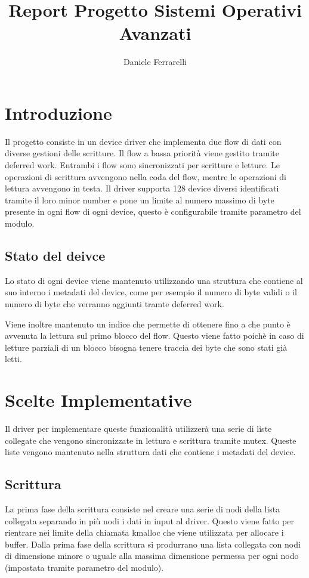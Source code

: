 \documentclass[a4paper,10pt]{article}
\title{Report Progetto Sistemi Operativi Avanzati}
\author{Daniele Ferrarelli}
\date{}
\begin{document}
\maketitle

\section{Introduzione}
Il progetto consiste in un device driver che implementa due flow di dati con diverse gestioni delle scritture. Il flow a bassa priorità viene gestito tramite deferred work. Entrambi i flow sono sincronizzati per scritture e letture. Le operazioni di scrittura avvengono nella coda del flow, mentre le operazioni di lettura avvengono in testa. Il driver supporta 128 device diversi identificati tramite il loro minor number e pone un limite al numero massimo di byte presente in ogni flow di ogni device, questo è configurabile tramite parametro del modulo.

\subsection{Stato del deivce}
Lo stato di ogni device viene mantenuto utilizzando una struttura che contiene al suo interno i metadati del device, come per esempio il numero di byte validi o il numero di byte che verranno aggiunti tramte deferred work.

Viene inoltre mantenuto un indice che permette di ottenere fino a che punto è avvenuta la lettura sul primo blocco del flow. Questo viene fatto poichè in caso di letture parziali di un blocco bisogna tenere traccia dei byte che sono stati già letti.

\section{Scelte Implementative}
Il driver per implementare queste funzionalità utilizzerà una serie di liste collegate che vengono sincronizzate in lettura e scrittura tramite mutex. Queste liste vengono mantenuto nella struttura dati che contiene i metadati del device.

\subsection{Scrittura}
La prima fase della scrittura consiste nel creare una serie di nodi della lista collegata separando in più nodi i dati in input al driver. Questo viene fatto per rientrare nei limite della chiamata kmalloc che viene utilizzata per allocare i buffer. Dalla prima fase della scrittura si produrrano una lista collegata con nodi di dimensione minore o uguale alla massima dimensione permessa per ogni nodo (impostata tramite parametro del modulo).
\end{document}
